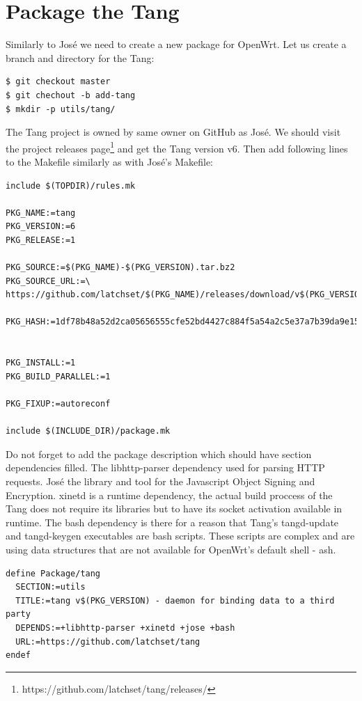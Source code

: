 \section{Package the Tang}
Similarly to José we need to create a new package for OpenWrt.
Let us create a branch and directory for the Tang:
\begin{lstlisting}[columns=fixed,basicstyle=\ttfamily\footnotesize,tabsize=4,backgroundcolor=\color{yellow!10}]
$ git checkout master
$ git chechout -b add-tang
$ mkdir -p utils/tang/
\end{lstlisting}
The Tang project is owned by same owner on GitHub as José.
We should visit the project releases page\footnote{https://github.com/latchset/tang/releases/} and get the Tang version v6.
Then add following lines to the Makefile similarly as with José's Makefile:
\begin{lstlisting}[columns=fixed,basicstyle=\ttfamily\footnotesize,tabsize=4,backgroundcolor=\color{yellow!10}]
include $(TOPDIR)/rules.mk

PKG_NAME:=tang
PKG_VERSION:=6
PKG_RELEASE:=1

PKG_SOURCE:=$(PKG_NAME)-$(PKG_VERSION).tar.bz2
PKG_SOURCE_URL:=\
https://github.com/latchset/$(PKG_NAME)/releases/download/v$(PKG_VERSION)/

PKG_HASH:=1df78b48a52d2ca05656555cfe52bd4427c884f5a54a2c5e37a7b39da9e155e3


PKG_INSTALL:=1
PKG_BUILD_PARALLEL:=1

PKG_FIXUP:=autoreconf

include $(INCLUDE_DIR)/package.mk
\end{lstlisting}
Do not forget to add the package description which should have section dependencies filled.
The libhttp-parser dependency used for parsing HTTP requests.
José the library and tool for the Javascript Object Signing and Encryption.
xinetd is a runtime dependency, the actual build proccess of the Tang does not require its libraries but to have its socket activation available in runtime.
The bash dependency is there for a reason that Tang's tangd-update and tangd-keygen executables are bash scripts.
These scripts are complex and are using data structures that are not available for OpenWrt's default shell - ash.
\begin{lstlisting}[columns=fixed,basicstyle=\ttfamily\footnotesize,tabsize=4,backgroundcolor=\color{yellow!10}]
define Package/tang
  SECTION:=utils
  TITLE:=tang v$(PKG_VERSION) - daemon for binding data to a third party
  DEPENDS:=+libhttp-parser +xinetd +jose +bash
  URL:=https://github.com/latchset/tang
endef
\end{lstlisting}
